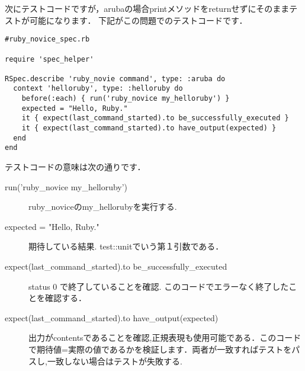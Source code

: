 次にテストコードですが，arubaの場合printメソッドをreturnせずにそのままテストが可能になります．
下記がこの問題でのテストコードです．
\begin{lstlisting}[style=customRuby]
#ruby_novice_spec.rb

require 'spec_helper'

RSpec.describe 'ruby_novie command', type: :aruba do 
  context 'helloruby', type: :helloruby do
    before(:each) { run('ruby_novice my_helloruby') }
    expected = "Hello, Ruby."
    it { expect(last_command_started).to be_successfully_executed }
    it { expect(last_command_started).to have_output(expected) }
  end
end
\end{lstlisting}
テストコードの意味は次の通りです．
\begin{description}
\item[run('ruby\_novice my\_helloruby')]  ruby\_noviceのmy\_hellorubyを実行する.

\item[expected = "Hello, Ruby."]  期待している結果. test::unitでいう第１引数である．

\item[expect(last\_command\_started).to be\_successfully\_executed]  status 0 で終了していることを確認. このコードでエラーなく終了したことを確認する．

\item[expect(last\_command\_started).to have\_output(expected)]  出力がcontentsであることを確認,正規表現も使用可能である．このコードで期待値=実際の値であるかを検証します．両者が一致すればテストをパスし,一致しない場合はテストが失敗する.

\end{description}
